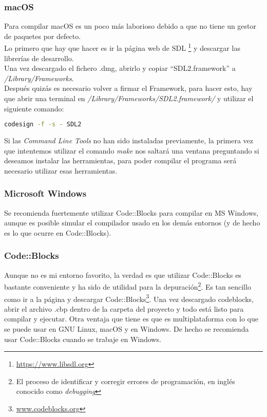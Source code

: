 \subsubsection{macOS}
Para compilar macOS es un poco más laborioso debido a que no tiene un gestor de paquetes por defecto.
\\ Lo primero que hay que hacer es ir la página web de SDL \footnote{\url{https://www.libsdl.org}} y descargar las librerías de desarrollo.
\\ Una vez descargado el fichero .dmg, abrirlo y copiar ``SDL2.framework'' a \textit{/Library/Frameworks}.
\\ Después quizás es necesario volver a firmar el Framework, para hacer esto, hay que abrir una terminal en \textit{/Library/Frameworks/SDL2.framework/} y utilizar el siguiente comando:
\begin{lstlisting}[language=bash]
  codesign -f -s - SDL2
\end{lstlisting}
Si las \textit{Command Line Tools} no han sido instaladas previamente, la primera vez que intentemos utilizar el comando \textit{make} nos saltará una ventana preguntando si deseamos instalar las herramientas, para poder compilar el programa será necesario utilizar esas herramientas.

\subsubsection{Microsoft Windows}
Se recomienda fuertemente utilizar Code::Blocks para compilar en MS Windows, aunque es posible simular el compilador usado en los demás entornos (y de hecho es lo que ocurre en Code::Blocks).

\subsubsection{Code::Blocks}
Aunque no es mi entorno favorito, la verdad es que utilizar Code::Blocks es bastante conveniente y ha sido de utilidad para la depuración\footnote{El proceso de identificar y corregir errores de programación, en inglés conocido como \textit{debugging}}. Es tan sencillo como ir a la página y descargar Code::Blocks\footnote{\url{www.codeblocks.org}}. Una vez descargado codeblocks, abrir el archivo .cbp dentro de la carpeta del proyecto y todo está listo para compilar y ejecutar. Otra ventaja que tiene es que es multiplataforma con lo que se puede usar en GNU Linux, macOS y en Windows. De hecho se recomienda usar Code::Blocks cuando se trabaje en Windows.

